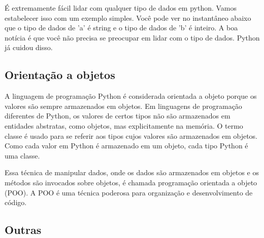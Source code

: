         É extremamente fácil lidar com qualquer tipo de dados em python. Vamos estabelecer isso com um exemplo simples. Você pode ver no instantâneo abaixo que o tipo de dados de 'a' é string e o tipo de dados de 'b' é inteiro. A boa notícia é que você não precisa se preocupar em lidar com o tipo de dados. Python já cuidou disso.

        \subsection{Orientação a objetos}
        A linguagem de programação Python é considerada orientada a objeto porque os valores são
        sempre armazenados em objetos. Em linguagens de programação diferentes de Python, os valores
        de certos tipos não são armazenados em entidades abstratas, como objetos, mas explicitamente na
        memória. O termo classe é usado para se referir aos tipos cujos valores são armazenados em
        objetos. Como cada valor em Python é armazenado em um objeto, cada tipo Python é uma classe. 
        
        Essa técnica de manipular dados, onde os dados são armazenados em objetos e os métodos são invocados sobre objetos, é chamada programação
        orientada a objeto (POO). A POO é uma técnica poderosa para organização e desenvolvimento
        de código. 

        \subsection{Outras} 